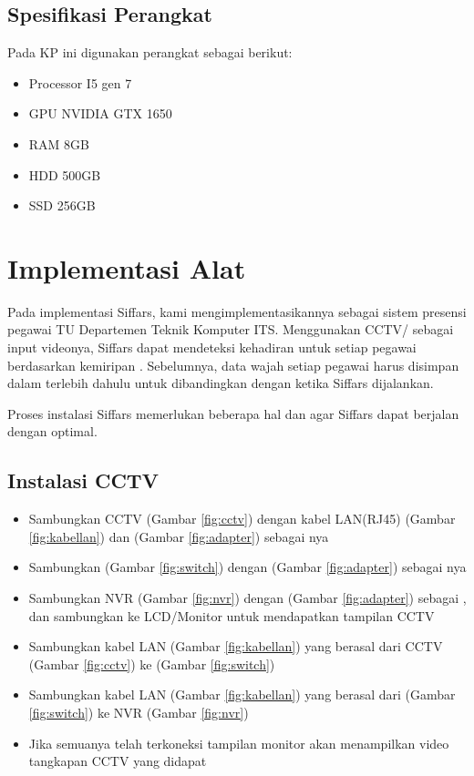 \subsection{Spesifikasi Perangkat}
Pada KP ini digunakan perangkat  sebagai berikut:
\begin{itemize}
  \item Processor I5 gen 7
  \item GPU NVIDIA GTX 1650
  \item RAM 8GB
  \item HDD 500GB
  \item SSD 256GB
\end{itemize}

\section{Implementasi Alat}

Pada implementasi Siffars, kami mengimplementasikannya sebagai sistem presensi pegawai TU Departemen
Teknik Komputer ITS. Menggunakan CCTV/  sebagai input videonya, Siffars dapat mendeteksi kehadiran untuk
setiap pegawai berdasarkan kemiripan . Sebelumnya, data wajah setiap pegawai harus
disimpan dalam  terlebih dahulu untuk dibandingkan dengan  ketika Siffars dijalankan.

Proses instalasi Siffars memerlukan beberapa hal dan  agar Siffars dapat berjalan dengan optimal.

\subsection{Instalasi CCTV}
\begin{itemize}
  \item Sambungkan CCTV (Gambar \ref{fig:cctv}) dengan kabel LAN(RJ45) (Gambar \ref{fig:kabellan}) dan  (Gambar \ref{fig:adapter}) sebagai nya
  \item Sambungkan  (Gambar \ref{fig:switch}) dengan  (Gambar \ref{fig:adapter}) sebagai  nya
  \item Sambungkan NVR (Gambar \ref{fig:nvr}) dengan  (Gambar \ref{fig:adapter}) sebagai , dan sambungkan ke LCD/Monitor untuk mendapatkan tampilan CCTV
  \item Sambungkan kabel LAN (Gambar \ref{fig:kabellan}) yang berasal dari CCTV (Gambar \ref{fig:cctv}) ke  (Gambar \ref{fig:switch})
  \item Sambungkan kabel LAN (Gambar \ref{fig:kabellan}) yang berasal dari  (Gambar \ref{fig:switch}) ke NVR (Gambar \ref{fig:nvr})
  \item Jika semuanya telah terkoneksi tampilan monitor akan menampilkan video tangkapan CCTV yang didapat
\end{itemize}

